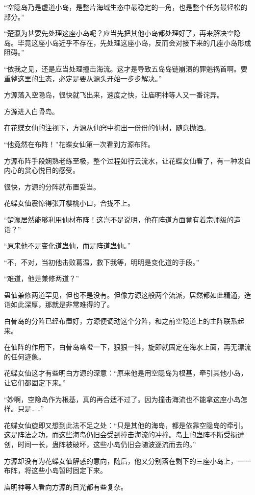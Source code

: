 \begin{this_body}
“空隐岛乃是虚道小岛，是整片海域生态中最稳定的一角，也是整个任务最轻松的部分。”

“楚瀛为甚要先处理这座小岛呢？应当先把其他小岛都处理好了，再来解决空隐岛。毕竟这座小岛近乎不存在，先处理这座小岛，反而会对接下来的几座小岛形成阻碍。”

“依我之见，还是应当处理撞击海流。这才是导致五岛岛链崩溃的罪魁祸首啊。要重整这里的生态，必定是要从源头开始一步步解决。”

方源落入空隐岛，很快就飞出来，速度之快，让庙明神等人又一番诧异。

方源进入白骨岛。

在花蝶女仙的注视下，方源从仙窍中掏出一份份的仙材，随意抛洒。

“他竟然在布阵！”花蝶女仙第一次看到方源布阵。

方源布阵手段娴熟老练至极，整个过程如行云流水，让花蝶女仙看了，有一种发自内心的赏心悦目的感受。

很快，方源的分阵就布置妥当。

花蝶女仙震惊得张开樱桃小口，合拢不上。

“楚瀛居然能够利用仙材布阵！这岂不是说明，他在阵道方面竟有着宗师级的造诣？”

“原来他不是变化道蛊仙，而是阵道蛊仙。”

“不，不对，当初他击败葛温，救下我等，明明是变化道的手段。”

“难道，他是兼修两道？”

蛊仙兼修两道罕见，但也不是没有。但像方源这般两个流派，居然都如此精通，造诣如此深厚，那就是非常难得的了。

白骨岛的分阵已经布置好，方源便调动这个分阵，和之前空隐道上的主阵联系起来。

在仙阵的作用下，白骨岛咯噔一下，狠狠一抖，旋即就固定在海水上面，再无漂流的任何迹象。

花蝶女仙这才有些明白方源的深意：“原来他是用空隐岛为根基，牵引其他小岛，让它们都固定下来。”

“妙啊，空隐岛作为根基，真的再合适不过了。因为撞击海流也不能拿这座小岛怎样。只是……”

花蝶女仙旋即又想到此法不足之处：“只是其他的海岛，都是依靠空隐岛的牵引。这是阵法之功，而这些海岛仍旧会受到撞击海流的冲撞。岛上的蛊阵不断受损遭创，时间一长，蛊阵被破坏，这些小岛仍旧会随波逐流而去的。”

方源却没有为花蝶女仙解惑的意向，随后，他又分别落在剩下的三座小岛上，一一布阵，将这些小岛暂时固定下来。

庙明神等人看向方源的目光都有些复杂。


\end{this_body}
